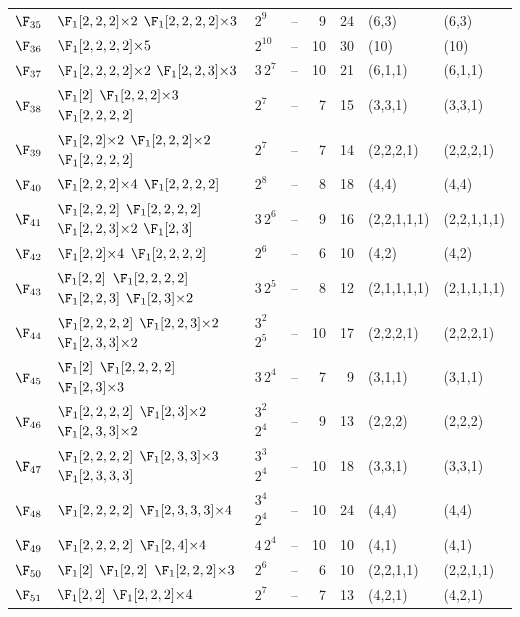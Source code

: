 \begin{landscape}
{\begin{longtable}{@{}l p{8.2cm} l l r r l l@{}}
$\F_{35}$ & $\F_{1}[2,2,2]{\times}2$\; $\F_{1}[2,2,2,2]{\times}3$ & $2^{9}$ & -- & 9 & 24 & (6,3) & (6,3) \\
$\F_{36}$ & $\F_{1}[2,2,2,2]{\times}5$ & $2^{10}$ & -- & 10 & 30 & (10) & (10) \\
$\F_{37}$ & $\F_{1}[2,2,2,2]{\times}2$\; $\F_{1}[2,2,3]{\times}3$ & $3$\,$2^{7}$ & -- & 10 & 21 & (6,1,1) & (6,1,1) \\
$\F_{38}$ & $\F_{1}[2]$\; $\F_{1}[2,2,2]{\times}3$\; $\F_{1}[2,2,2,2]$ & $2^{7}$ & -- & 7 & 15 & (3,3,1) & (3,3,1) \\
$\F_{39}$ & $\F_{1}[2,2]{\times}2$\; $\F_{1}[2,2,2]{\times}2$\; $\F_{1}[2,2,2,2]$ & $2^{7}$ & -- & 7 & 14 & (2,2,2,1) & (2,2,2,1) \\
$\F_{40}$ & $\F_{1}[2,2,2]{\times}4$\; $\F_{1}[2,2,2,2]$ & $2^{8}$ & -- & 8 & 18 & (4,4) & (4,4) \\
$\F_{41}$ & $\F_{1}[2,2,2]$\; $\F_{1}[2,2,2,2]$\; $\F_{1}[2,2,3]{\times}2$\; $\F_{1}[2,3]$ & $3$\,$2^{6}$ & -- & 9 & 16 & (2,2,1,1,1) & (2,2,1,1,1) \\
$\F_{42}$ & $\F_{1}[2,2]{\times}4$\; $\F_{1}[2,2,2,2]$ & $2^{6}$ & -- & 6 & 10 & (4,2) & (4,2) \\
$\F_{43}$ & $\F_{1}[2,2]$\; $\F_{1}[2,2,2,2]$\; $\F_{1}[2,2,3]$\; $\F_{1}[2,3]{\times}2$ & $3$\,$2^{5}$ & -- & 8 & 12 & (2,1,1,1,1) & (2,1,1,1,1) \\
$\F_{44}$ & $\F_{1}[2,2,2,2]$\; $\F_{1}[2,2,3]{\times}2$\; $\F_{1}[2,3,3]{\times}2$ & $3^{2}$\,$2^{5}$ & -- & 10 & 17 & (2,2,2,1) & (2,2,2,1) \\
$\F_{45}$ & $\F_{1}[2]$\; $\F_{1}[2,2,2,2]$\; $\F_{1}[2,3]{\times}3$ & $3$\,$2^{4}$ & -- & 7 & 9 & (3,1,1) & (3,1,1) \\
$\F_{46}$ & $\F_{1}[2,2,2,2]$\; $\F_{1}[2,3]{\times}2$\; $\F_{1}[2,3,3]{\times}2$ & $3^{2}$\,$2^{4}$ & -- & 9 & 13 & (2,2,2) & (2,2,2) \\
$\F_{47}$ & $\F_{1}[2,2,2,2]$\; $\F_{1}[2,3,3]{\times}3$\; $\F_{1}[2,3,3,3]$ & $3^{3}$\,$2^{4}$ & -- & 10 & 18 & (3,3,1) & (3,3,1) \\
$\F_{48}$ & $\F_{1}[2,2,2,2]$\; $\F_{1}[2,3,3,3]{\times}4$ & $3^{4}$\,$2^{4}$ & -- & 10 & 24 & (4,4) & (4,4) \\
$\F_{49}$ & $\F_{1}[2,2,2,2]$\; $\F_{1}[2,4]{\times}4$ & $4$\,$2^{4}$ & -- & 10 & 10 & (4,1) & (4,1) \\
$\F_{50}$ & $\F_{1}[2]$\; $\F_{1}[2,2]$\; $\F_{1}[2,2,2]{\times}3$ & $2^{6}$ & -- & 6 & 10 & (2,2,1,1) & (2,2,1,1) \\
$\F_{51}$ & $\F_{1}[2,2]$\; $\F_{1}[2,2,2]{\times}4$ & $2^{7}$ & -- & 7 & 13 & (4,2,1) & (4,2,1) \\

\end{longtable}}
\end{landscape}
